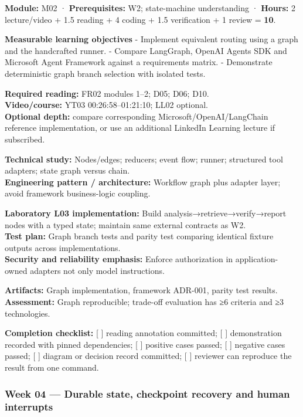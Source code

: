 \documentclass[
  10pt,
]{article}
\begin{document}
\textbf{Module:} M02 · \textbf{Prerequisites:} W2; state-machine
understanding · \textbf{Hours:} 2 lecture/video + 1.5 reading + 4 coding
+ 1.5 verification + 1 review = \textbf{10}.

\textbf{Measurable learning objectives} - Implement equivalent routing
using a graph and the handcrafted runner. - Compare LangGraph, OpenAI
Agents SDK and Microsoft Agent Framework against a requirements matrix.
- Demonstrate deterministic graph branch selection with isolated tests.

\textbf{Required reading:} FR02 modules 1--2; D05; D06; D10.\\
\textbf{Video/course:} YT03 00:26:58--01:21:10; LL02 optional.\\
\textbf{Optional depth:} compare corresponding
Microsoft/OpenAI/LangChain reference implementation, or use an
additional LinkedIn Learning lecture if subscribed.

\textbf{Technical study:} Nodes/edges; reducers; event flow; runner;
structured tool adapters; state graph versus chain.\\
\textbf{Engineering pattern / architecture:} Workflow graph plus adapter
layer; avoid framework business-logic coupling.

\textbf{Laboratory L03 implementation:} Build
analysis→retrieve→verify→report nodes with a typed state; maintain same
external contracts as W2.\\
\textbf{Test plan:} Graph branch tests and parity test comparing
identical fixture outputs across implementations.\\
\textbf{Security and reliability emphasis:} Enforce authorization in
application-owned adapters not only model instructions.

\textbf{Artifacts:} Graph implementation, framework ADR-001, parity test
results.\\
\textbf{Assessment:} Graph reproducible; trade-off evaluation has ≥6
criteria and ≥3 technologies.

\textbf{Completion checklist:} {[} {]} reading annotation committed; {[}
{]} demonstration recorded with pinned dependencies; {[} {]} positive
cases passed; {[} {]} negative cases passed; {[} {]} diagram or decision
record committed; {[} {]} reviewer can reproduce the result from one
command.

\subsubsection{Week 04 --- Durable state, checkpoint recovery and human
interrupts}\label{week-04-durable-state-checkpoint-recovery-and-human-interrupts}
\end{document}
